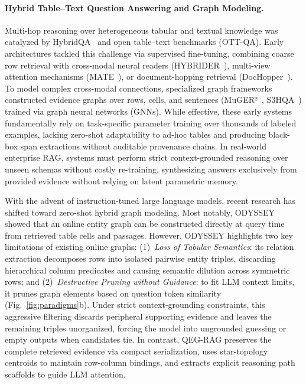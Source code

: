 \documentclass[runningheads]{llncs}
\begin{document}
\paragraph{Hybrid Table--Text Question Answering and Graph Modeling.}
Multi-hop reasoning over heterogeneous tabular and textual knowledge was catalyzed by HybridQA~\cite{hybridqa} and open table--text benchmarks (OTT-QA). Early architectures tackled this challenge via supervised fine-tuning, combining coarse row retrieval with cross-modal neural readers (HYBRIDER~\cite{hybridqa}), multi-view attention mechanisms (MATE~\cite{eisenschlos2021mate}), or document-hopping retrieval (DocHopper~\cite{sun2021dochopper}). To model complex cross-modal connections, specialized graph frameworks constructed evidence graphs over rows, cells, and sentences (MuGER²~\cite{chen2022muger2}, S3HQA~\cite{lei2023s3hqa}) trained via graph neural networks (GNNs). While effective, these early systems fundamentally rely on task-specific parameter training over thousands of labeled examples, lacking zero-shot adaptability to ad-hoc tables and producing black-box span extractions without auditable provenance chains. In real-world enterprise RAG, systems must perform strict context-grounded reasoning over unseen schemas without costly re-training, synthesizing answers exclusively from provided evidence without relying on latent parametric memory.

With the advent of instruction-tuned large language models, recent research has shifted toward zero-shot hybrid graph modeling. Most notably, ODYSSEY~\cite{agarwal2025hybrid} showed that an online entity graph can be constructed directly at query time from retrieved table cells and passages. However, ODYSSEY highlights two key limitations of existing online graphs: (1)~\emph{Loss of Tabular Semantics}: its relation extraction decomposes rows into isolated pairwise entity triples, discarding hierarchical column predicates and causing semantic dilution across symmetric rows; and (2)~\emph{Destructive Pruning without Guidance}: to fit LLM context limits, it prunes graph elements based on question token similarity (Fig.~\ref{fig:paradigms}b). Under strict context-grounding constraints, this aggressive filtering discards peripheral supporting evidence and leaves the remaining triples unorganized, forcing the model into ungrounded guessing or empty outputs when candidates tie. In contrast, QEG-RAG preserves the complete retrieved evidence via compact serialization, uses star-topology centroids to maintain row-column bindings, and extracts explicit reasoning path scaffolds to guide LLM attention.
\end{document}
